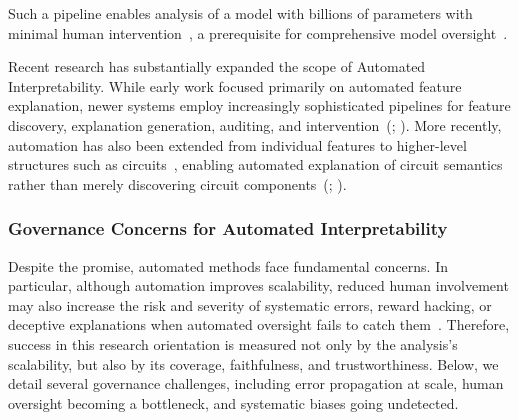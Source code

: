 Such a pipeline enables analysis of a model with billions of parameters with minimal human intervention~, a prerequisite for comprehensive model oversight~. 


Recent research has substantially expanded the scope of Automated Interpretability. While early work focused primarily on automated feature explanation, newer systems employ increasingly sophisticated pipelines for feature discovery, explanation generation, auditing, and intervention~(; ). More recently, automation has also been extended from individual features to higher-level structures such as circuits~, enabling automated explanation of circuit semantics rather than merely discovering circuit components~(; ).

\subsubsection{Governance Concerns for Automated Interpretability}

Despite the promise, automated methods face fundamental concerns. In particular, although automation improves scalability, reduced human involvement may also increase the risk and severity of systematic errors, reward hacking, or deceptive explanations when automated oversight fails to catch them~. Therefore, success in this research orientation is measured not only by the analysis's scalability, but also by its coverage, faithfulness, and trustworthiness. Below, we detail several governance challenges, including error propagation at scale, human oversight becoming a bottleneck, and systematic biases going undetected.

